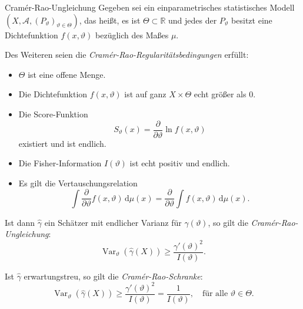 \begin{defi}{Cramér-Rao-Ungleichung}
    Gegeben sei ein einparametrisches statistisches Modell $(X,{\mathcal {A}},(P_{\vartheta })_{\vartheta \in \Theta })$, das heißt, es ist $\Theta \subset \mathbb{R}$ und jedes der $P_{\vartheta}$ besitzt eine Dichtefunktion $f(x,\vartheta)$ bezüglich des Maßes $\mu$.

    Des Weiteren seien die \emph{Cramér-Rao-Regularitätsbedingungen} erfüllt:

    \begin{itemize}
        \item $\Theta$ ist eine offene Menge.
        \item Die Dichtefunktion $f(x, \vartheta)$ ist auf ganz $X \times \Theta$ echt größer als $0$.
        \item Die Score-Funktion
              \[
                  S_{\vartheta}(x) = \frac{\partial}{\partial \vartheta} \ln f(x, \vartheta)
              \]
              existiert und ist endlich.
        \item Die Fisher-Information $I(\vartheta)$ ist echt positiv und endlich.
        \item Es gilt die Vertauschungsrelation
              \[
                  \int \frac{\partial}{\partial \vartheta} f(x, \vartheta) \, \mathrm{d} \mu(x) = \frac{\partial}{\partial \vartheta} \int f(x, \vartheta) \, \mathrm{d} \mu(x).
              \]
    \end{itemize}

    Ist dann $\hat{\gamma}$ ein Schätzer mit endlicher Varianz für $\gamma(\vartheta)$, so gilt die \emph{Cramér-Rao-Ungleichung}:
    \[
        \operatorname{Var}_{\vartheta}(\hat{\gamma}(X)) \geq \frac{\gamma'(\vartheta)^2}{I(\vartheta)}.
    \]

    Ist $\hat{\gamma}$ erwartungstreu, so gilt die \emph{Cramér-Rao-Schranke}:
    \[
        \operatorname{Var}_{\vartheta}(\hat{\gamma}(X)) \geq \frac{\gamma'(\vartheta)^2}{I(\vartheta)} = \frac{1}{I(\vartheta)}, \quad \text{für alle } \vartheta \in \Theta.
    \]
\end{defi}


